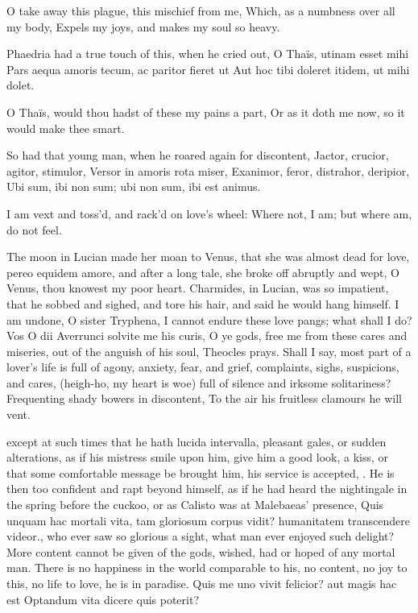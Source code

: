 O take away this plague, this mischief from me,
Which, as a numbness over all my body,
Expels my joys, and makes my soul so heavy.

Phaedria had a true touch of this, when he cried out,
O Thaïs, utinam esset mihi
Pars aequa amoris tecum, ac paritor fieret ut
Aut hoc tibi doleret itidem, ut mihi dolet.

O Thaïs, would thou hadst of these my pains a part,
Or as it doth me now, so it would make thee smart.

So had that young man, when he roared again for discontent,
Jactor, crucior, agitor, stimulor,
Versor in amoris rota miser,
Exanimor, feror, distrahor, deripior,
Ubi sum, ibi non sum; ubi non sum, ibi est animus.

I am vext and toss'd, and rack'd on love's wheel:
Where not, I am; but where am, do not feel.

The moon in Lucian made her moan to Venus, that she was almost
dead for love, pereo equidem amore, and after a long tale, she broke
off abruptly and wept, O Venus, thou knowest my poor heart.
Charmides, in Lucian, was so impatient, that he sobbed and
sighed, and tore his hair, and said he would hang himself. I am undone,
O sister Tryphena, I cannot endure these love pangs; what shall I do?
Vos O dii Averrunci solvite me his curis, O ye gods, free me from these
cares and miseries, out of the anguish of his soul, Theocles
prays. Shall I say, most part of a lover's life is full of agony,
anxiety, fear, and grief, complaints, sighs, suspicions, and cares,
(heigh-ho, my heart is woe) full of silence and irksome solitariness?
Frequenting shady bowers in discontent,
To the air his fruitless clamours he will vent.

except at such times that he hath lucida intervalla, pleasant gales, or
sudden alterations, as if his mistress smile upon him, give him a good
look, a kiss, or that some comfortable message be brought him, his
service is accepted, \etc{}.
He is then too confident and rapt beyond himself, as if he had heard
the nightingale in the spring before the cuckoo, or as Calisto
was at Malebaeas' presence, Quis unquam hac mortali vita, tam gloriosum
corpus vidit? humanitatem transcendere videor., \etc{} who ever saw so
glorious a sight, what man ever enjoyed such delight? More content
cannot be given of the gods, wished, had or hoped of any mortal man.
There is no happiness in the world comparable to his, no content, no
joy to this, no life to love, he is in paradise.
Quis me uno vivit felicior? aut magis hac est
Optandum vita dicere quis poterit?

